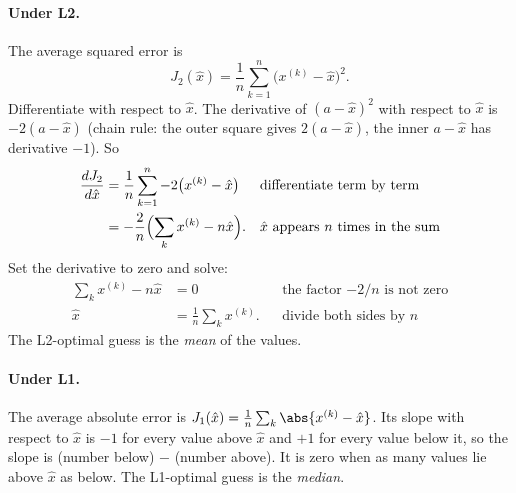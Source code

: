 \paragraph{Under L2.} The average squared error is
\[
J_2(\hat{x}) = \frac1n\sum_{k=1}^{n}\bigl(x^{(k)} - \hat{x}\bigr)^2.
\]
Differentiate with respect to $\hat{x}$. The derivative of $(a-\hat{x})^2$ with respect to $\hat{x}$
is $-2(a-\hat{x})$ (chain rule: the outer square gives $2(a-\hat{x})$, the inner $a-\hat{x}$ has
derivative $-1$). So
\begin{align*}
\frac{dJ_2}{d\hat{x}} &= \frac1n\sum_{k=1}^{n} -2\bigl(x^{(k)}-\hat{x}\bigr)
  && \text{differentiate term by term}\\
&= -\frac2n\Bigl(\sum_{k} x^{(k)} - n\hat{x}\Bigr).
  && \text{$\hat{x}$ appears $n$ times in the sum}
\end{align*}
Set the derivative to zero and solve:
\begin{align*}
\sum_{k} x^{(k)} - n\hat{x} &= 0
  && \text{the factor $-2/n$ is not zero}\\
\hat{x} &= \frac1n\sum_{k} x^{(k)}.
  && \text{divide both sides by $n$}
\end{align*}
The L2-optimal guess is the \emph{mean} of the values.

\paragraph{Under L1.} The average absolute error is
$J_1(\hat{x}) = \frac1n\sum_k \abs{x^{(k)}-\hat{x}}$. Its slope with respect to $\hat{x}$ is $-1$ for
every value above $\hat{x}$ and $+1$ for every value below it, so the slope is
(number below) $-$ (number above). It is zero when as many values lie above $\hat{x}$ as below. The
L1-optimal guess is the \emph{median}.

